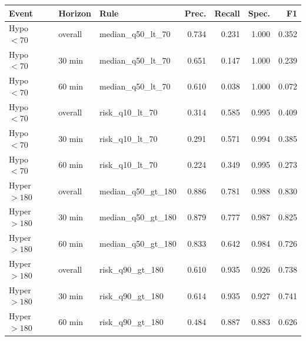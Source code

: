 \begin{tabular}{lllrrrr}
\toprule
Event & Horizon & Rule & Prec. & Recall & Spec. & F1 \\
\midrule
Hypo $<70$ & overall & median\_q50\_lt\_70 & 0.734 & 0.231 & 1.000 & 0.352 \\
Hypo $<70$ & 30 min & median\_q50\_lt\_70 & 0.651 & 0.147 & 1.000 & 0.239 \\
Hypo $<70$ & 60 min & median\_q50\_lt\_70 & 0.610 & 0.038 & 1.000 & 0.072 \\
Hypo $<70$ & overall & risk\_q10\_lt\_70 & 0.314 & 0.585 & 0.995 & 0.409 \\
Hypo $<70$ & 30 min & risk\_q10\_lt\_70 & 0.291 & 0.571 & 0.994 & 0.385 \\
Hypo $<70$ & 60 min & risk\_q10\_lt\_70 & 0.224 & 0.349 & 0.995 & 0.273 \\
Hyper $>180$ & overall & median\_q50\_gt\_180 & 0.886 & 0.781 & 0.988 & 0.830 \\
Hyper $>180$ & 30 min & median\_q50\_gt\_180 & 0.879 & 0.777 & 0.987 & 0.825 \\
Hyper $>180$ & 60 min & median\_q50\_gt\_180 & 0.833 & 0.642 & 0.984 & 0.726 \\
Hyper $>180$ & overall & risk\_q90\_gt\_180 & 0.610 & 0.935 & 0.926 & 0.738 \\
Hyper $>180$ & 30 min & risk\_q90\_gt\_180 & 0.614 & 0.935 & 0.927 & 0.741 \\
Hyper $>180$ & 60 min & risk\_q90\_gt\_180 & 0.484 & 0.887 & 0.883 & 0.626 \\
\bottomrule
\end{tabular}
